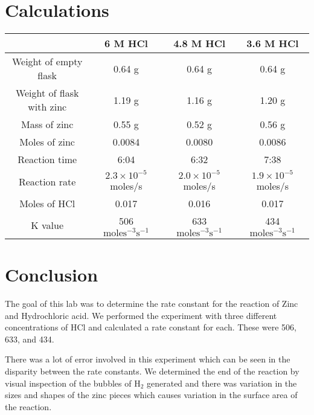 \documentclass[12pt]{article}
\begin{document}
    \section*{Calculations}
    \begin{table}[h!]
        \centering
        \begin{tabular}{c|ccc}
            & 6 M HCl & 4.8 M HCl & 3.6 M HCl \\
            \hline
            Weight of empty flask &  0.64 g &  0.64 g &  0.64 g \\
            Weight of flask with zinc &  1.19 g &  1.16 g &  1.20 g \\
            Mass of zinc &  0.55 g &  0.52 g &  0.56 g \\
            Moles of zinc &  0.0084 & 0.0080 & 0.0086 \\
            Reaction time & 6:04 & 6:32 & 7:38 \\
            Reaction rate & \(2.3 \times 10^{-5}\) moles/s & \(2.0 \times 10^{-5}\) moles/s & \(1.9 \times 10^{-5}\) moles/s \\
            Moles of HCl & 0.017 & 0.016 & 0.017 \\
            K value & 506 \(\mathrm{moles^{-3}s^{-1}}\) & 633 \(\mathrm{moles^{-3}s^{-1}}\) & 434 \(\mathrm{moles^{-3}s^{-1}}\)\\
        \end{tabular}
    \end{table}

    \section*{Conclusion}
        The goal of this lab was to determine the rate constant for the reaction of Zinc and Hydrochloric acid. We performed the experiment with three different concentrations of HCl and calculated a rate constant for each. These were 506, 633, and 434. 

        There was a lot of error involved in this experiment which can be seen in the disparity between the rate constants. We determined the end of the reaction by visual inspection of the bubbles of \(\mathrm{H_2}\) generated and there was variation in the sizes and shapes of the zinc pieces which causes variation in the surface area of the reaction. 
\end{document}
